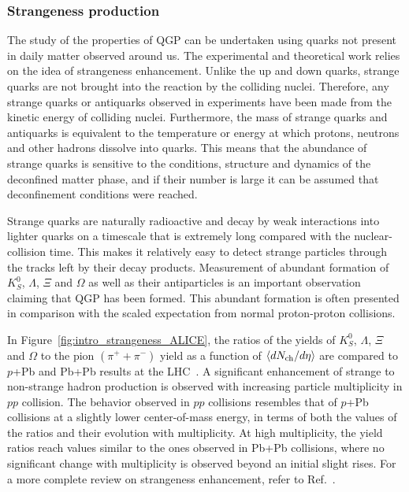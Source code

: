 \subsubsection{Strangeness production}

The study of the properties of QGP can be undertaken using quarks not present in daily matter observed around us. The experimental and theoretical work relies on the idea of strangeness enhancement. Unlike the up and down quarks, strange quarks are not brought into the reaction by the colliding nuclei. Therefore, any strange quarks or antiquarks observed in experiments have been made from the kinetic energy of colliding nuclei. Furthermore, the mass of strange quarks and antiquarks is equivalent to the temperature or energy at which protons, neutrons and other hadrons dissolve into quarks. This means that the abundance of strange quarks is sensitive to the conditions, structure and dynamics of the deconfined matter phase, and if their number is large it can be assumed that deconfinement conditions were reached.

Strange quarks are naturally radioactive and decay by weak interactions into lighter quarks on a timescale that is extremely long compared with the nuclear-collision time. This makes it relatively easy to detect strange particles through the tracks left by their decay products. Measurement of abundant formation of $K_S^0$, $\Lambda$, $\Xi$ and $\Omega$ as well as their antiparticles is an important observation claiming that QGP has been formed. This abundant formation is often presented in comparison with the scaled expectation from normal proton-proton collisions.

In Figure~\ref{fig:intro_strangeness_ALICE}, the ratios of the yields of $K_S^0$, $\Lambda$, $\Xi$ and $\Omega$ to the pion $(\pi^+ + \pi^-)$ yield as a function of $\left\langle dN_\text{ch} / d\eta\right\rangle$ are compared to $p$+Pb and Pb+Pb results at the LHC~\cite{ALICE:2017jyt}. A significant enhancement of strange to non-strange hadron production is observed with increasing particle multiplicity in $pp$ collision. The behavior observed in $pp$ collisions resembles that of $p$+Pb collisions at a slightly lower center-of-mass energy, in terms of both the values of the ratios and their evolution with multiplicity. At high multiplicity, the yield ratios reach values similar to the ones observed in Pb+Pb collisions, where no significant change with multiplicity is observed beyond an initial slight rises. For a more complete review on strangeness enhancement, refer to Ref.~\cite{Koch:2017pda}.

